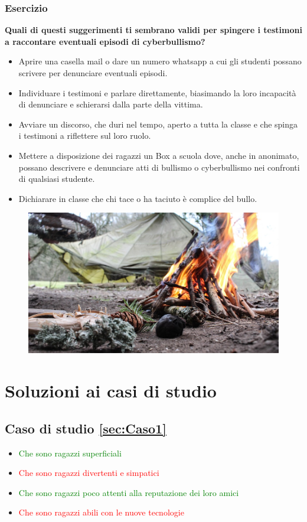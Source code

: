 \documentclass{article}
\begin{document}
\subsubsection{Esercizio}
\label{sec:Caso20}
\textbf{Quali di questi suggerimenti ti sembrano validi per spingere i testimoni a raccontare eventuali episodi di cyberbullismo?}
\begin{itemize}
	\item Aprire una casella mail o dare un numero whatsapp a cui gli studenti possano scrivere per denunciare eventuali episodi.		
	\item Individuare i testimoni e parlare direttamente, biasimando la loro incapacità di denunciare e schierarsi dalla parte della vittima.		
	\item Avviare un discorso, che duri nel tempo, aperto a tutta la classe e che spinga i testimoni a riflettere sul loro ruolo.		
	\item Mettere a disposizione dei ragazzi un Box a scuola dove, anche in anonimato, possano descrivere e denunciare atti di bullismo o cyberbullismo nei confronti di qualsiasi studente.		
	\item Dichiarare in classe che chi tace o ha taciuto è complice del bullo.
\end{itemize}
\vspace{20mm}
\begin{figure}[h!]
	\centering
	\includegraphics[scale=1.7]{Fuoco1.jpg}
\end{figure}

	\pagebreak
	
	\section{Soluzioni ai casi di studio}
	\subsection{Caso di studio \ref{sec:Caso1}}
		\begin{itemize}
			\item \textcolor{green}{Che sono ragazzi superficiali}
			\item \textcolor{red}{Che sono ragazzi divertenti e simpatici}
			\item \textcolor{green}{Che sono ragazzi poco attenti alla reputazione dei loro amici}
			\item \textcolor{red}{Che sono ragazzi abili con le nuove tecnologie}
		\end{itemize}
\end{document}
